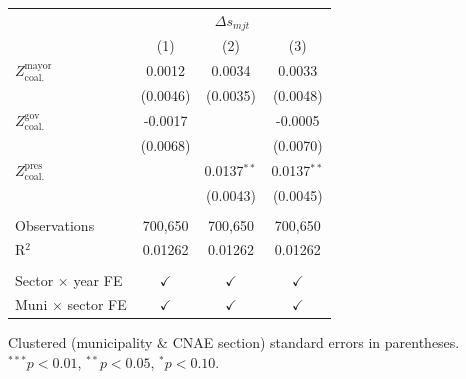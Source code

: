 \begingroup
\centering
\begin{tabular}{lccc}
   \toprule
    & \multicolumn{3}{c}{$\Delta s_{mjt}$}\\
                                       & (1)           & (2)           & (3)\\  
   \midrule 
   $Z^{\text{mayor}}_{\text{coal.}}$   & 0.0012        & 0.0034        & 0.0033\\   
                                       & (0.0046)      & (0.0035)      & (0.0048)\\   
   $Z^{\text{gov}}_{\text{coal.}}$     & -0.0017       &               & -0.0005\\   
                                       & (0.0068)      &               & (0.0070)\\   
   $Z^{\text{pres}}_{\text{coal.}}$    &               & 0.0137$^{**}$ & 0.0137$^{**}$\\   
                                       &               & (0.0043)      & (0.0045)\\   
    \\
   Observations                        & 700,650       & 700,650       & 700,650\\  
   R$^2$                               & 0.01262       & 0.01262       & 0.01262\\  
    \\
   Sector $\times$ year FE             & $\checkmark$  & $\checkmark$  & $\checkmark$\\   
   Muni $\times$ sector FE             & $\checkmark$  & $\checkmark$  & $\checkmark$\\   
   \bottomrule
\end{tabular}
 
\par \raggedright 
Clustered (municipality \& CNAE section) standard errors in parentheses. $^{***}p<0.01$, $^{**}p<0.05$, $^{*}p<0.10$.
\par\endgroup
